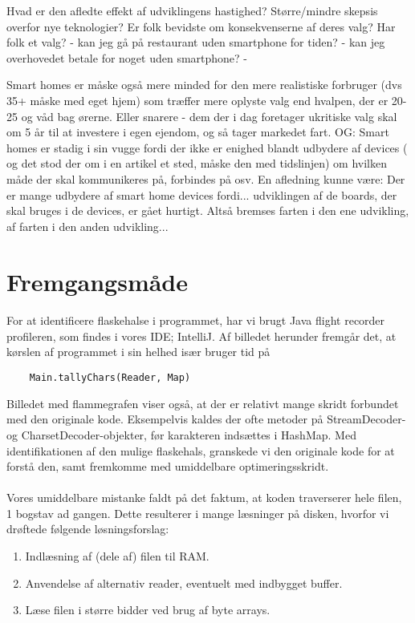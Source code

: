\documentclass{article}
\begin{document}
Hvad er den afledte effekt af udviklingens hastighed?
Større/mindre skepsis overfor nye teknologier?
Er folk bevidste om konsekvenserne af deres valg?
Har folk et valg? 
- kan jeg gå på restaurant uden smartphone for tiden?
- kan jeg overhovedet betale for noget uden smartphone?
- 

Smart homes er måske også mere minded for den mere realistiske forbruger (dvs 35+ måske med eget hjem) som træffer mere oplyste valg end hvalpen, der er 20-25 og våd bag ørerne.
Eller snarere - dem der i dag foretager ukritiske valg skal om 5 år til at investere i egen ejendom, og så tager markedet fart.
OG: Smart homes er stadig i sin vugge fordi der ikke er enighed blandt udbydere af devices ( og det stod der om i en artikel et sted, måske den med tidslinjen) om hvilken måde der skal kommunikeres på, forbindes på osv. En afledning kunne være: Der er mange udbydere af smart home devices fordi... udviklingen af de boards, der skal bruges i de devices, er gået hurtigt. Altså bremses farten i den ene udvikling, af farten i den anden udvikling...
\section{Fremgangsmåde}
\paragraph{}
For at identificere flaskehalse i programmet, har vi brugt Java flight recorder profileren, som findes i vores IDE; IntelliJ. 
Af billedet herunder fremgår det, at kørslen af programmet i sin helhed især bruger tid på \begin{verbatim}
    Main.tallyChars(Reader, Map)
\end{verbatim}

Billedet med flammegrafen viser også, at der er relativt mange skridt forbundet med den originale kode. Eksempelvis kaldes der ofte metoder på StreamDecoder- og CharsetDecoder-objekter, før karakteren indsættes i HashMap.
Med identifikationen af den mulige flaskehals, granskede vi den originale kode for at forstå den, samt fremkomme med umiddelbare optimeringsskridt.

\paragraph{}
Vores umiddelbare mistanke faldt på det faktum, at koden traverserer hele filen, 1 bogstav ad gangen. Dette resulterer i mange læsninger på disken, hvorfor vi drøftede følgende løsningsforslag:
\begin{enumerate}
    \item Indlæsning af (dele af) filen til RAM.
    \item Anvendelse af alternativ reader, eventuelt med indbygget buffer.
    \item Læse filen i større bidder ved brug af byte arrays.
\end{enumerate}
\end{document}
